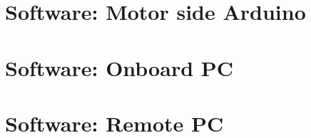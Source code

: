 \section{Software: Motor side Arduino}

\section{Software: Onboard PC}

\section{Software: Remote PC}